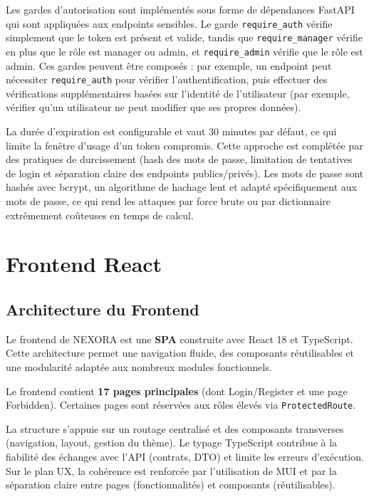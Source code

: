 \documentclass[12pt,a4paper]{report}
\begin{document}
Les gardes d'autorisation sont implémentés sous forme de dépendances FastAPI qui sont appliquées aux endpoints sensibles. Le garde \texttt{require\_auth} vérifie simplement que le token est présent et valide, tandis que \texttt{require\_manager} vérifie en plus que le rôle est manager ou admin, et \texttt{require\_admin} vérifie que le rôle est admin. Ces gardes peuvent être composés : par exemple, un endpoint peut nécessiter \texttt{require\_auth} pour vérifier l'authentification, puis effectuer des vérifications supplémentaires basées sur l'identité de l'utilisateur (par exemple, vérifier qu'un utilisateur ne peut modifier que ses propres données).

La durée d'expiration est configurable et vaut 30 minutes par défaut, ce qui limite la fenêtre d'usage d'un token compromis. Cette approche est complétée par des pratiques de durcissement (hash des mots de passe, limitation de tentatives de login et séparation claire des endpoints publics/privés). Les mots de passe sont hashés avec bcrypt, un algorithme de hachage lent et adapté spécifiquement aux mots de passe, ce qui rend les attaques par force brute ou par dictionnaire extrêmement coûteuses en temps de calcul.

\newpage
\chapter{Frontend React}

\section{Architecture du Frontend}
Le frontend de NEXORA est une \textbf{SPA} construite avec React 18 et TypeScript. Cette architecture permet une navigation fluide, des composants réutilisables et une modularité adaptée aux nombreux modules fonctionnels.

Le frontend contient \textbf{17 pages principales} (dont Login/Register et une page Forbidden). Certaines pages sont réservées aux rôles élevés via \texttt{ProtectedRoute}.

La structure s'appuie sur un routage centralisé et des composants transverses (navigation, layout, gestion du thème). Le typage TypeScript contribue à la fiabilité des échanges avec l'API (contrats, DTO) et limite les erreurs d'exécution. Sur le plan UX, la cohérence est renforcée par l'utilisation de MUI et par la séparation claire entre pages (fonctionnalités) et composants (réutilisables).
\end{document}
